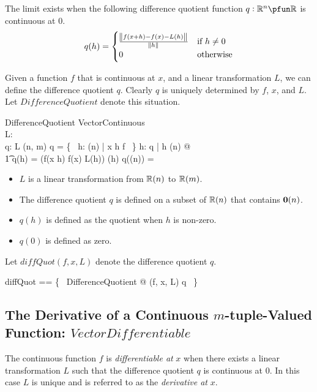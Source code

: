 \documentclass[11pt, oneside]{article}
\begin{document}
The limit exists when the following difference quotient function $q: \R^n \pfun \R$ is continuous at $0$.
$$
q(h) = 
\begin{cases}
	\frac{\norm{f(x+h) - f(x) - L(h)}}{\norm{h}}	&	\text{if } h \neq 0\\
	0								&	\text{otherwise}
\end{cases}
$$

Given a function $f$ that is continuous at $x$, and a linear transformation $L$,
we can define the difference quotient $q$.
Clearly $q$ is uniquely determined by $f$, $x$, and $L$.
Let $DifferenceQuotient$ denote this situation.

\begin{schema}{DifferenceQuotient}
	VectorContinuous \\
	L: \Rinf \pfun \Rinf \\
	q: \Rinf \pfun \R
\where
	L \in \linRtup(n, m)
\also
	\dom q = \{~ h: \Rtup(n) | x \addRinf h \in \dom f ~\}
\also
	\forall h: \dom q | h \neq \zeroRtup(n) @ \\
	\t1	q(h) = \normRinf(f(x \addRinf h) \subRinf f(x) \subRinf L(h)) \divR \normRinf(h)
\also
	q(\zeroRtup(n)) = \zeroR
\end{schema}

\begin{itemize}
\item $L$ is a linear transformation from $\operatorname{\mathbb{R}}(n)$ to $\operatorname{\mathbb{R}}(m)$.
\item The difference quotient $q$ is defined on a subset of $\operatorname{\mathbb{R}}(n)$ that contains $\operatorname{\mathbf{0}}(n)$.
\item $q(h)$ is defined as the quotient when $h$ is non-zero.
\item $q(0)$ is defined as zero.
\end{itemize}

Let $diffQuot(f,x,L)$ denote the difference quotient $q$.

\begin{zed}
diffQuot == \{~ DifferenceQuotient @ (f, x, L) \mapsto q ~\}
\end{zed}

\subsection{The Derivative of a Continuous $m$-tuple-Valued Function: $VectorDifferentiable$}

The continuous function $f$ is \textit{differentiable at} $x$ when there exists a linear transformation $L$ 
such that the difference quotient $q$ is continuous at $0$.
In this case $L$ is unique and is referred to as the \textit{derivative at} $x$.
\end{document}
